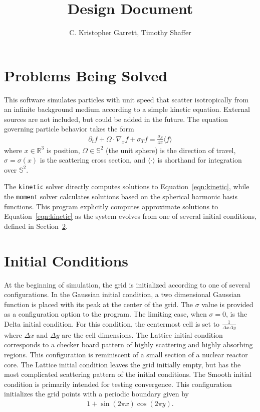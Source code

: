 \documentclass{article}
\title{Design Document}
\author{C. Kristopher Garrett, Timothy Shaffer}
\newcommand{\integral}[1]{\ensuremath{\langle #1 \rangle}}
\newcommand{\twosphere}{\ensuremath{\mathbb{S}^2}\xspace}
\newcommand{\threespace}{\ensuremath{\mathbb{R}^3}\xspace}
\newcommand{\kinetic}{\texttt{kinetic}\xspace}
\newcommand{\moment}{\texttt{moment}\xspace}
\begin{document}
\maketitle

\section{Problems Being Solved}
This software simulates particles with unit speed that scatter isotropically from
an infinite background medium according to a simple kinetic equation. External sources
are not included, but could be added in the future. The equation governing particle
behavior takes the form
\begin{align}
    \label{eqn:kinetic}
    \partial_t f + \Omega \cdot \nabla_x f + \sigma_T f =
    \frac{\sigma_S}{4\pi} \integral{f}
\end{align}
where $x \in \threespace$ is position, $\Omega \in \twosphere$ (the unit sphere)
is the direction of travel, $\sigma = \sigma(x)$ is the scattering cross section, and
\integral{\cdot} is shorthand for integration over \twosphere.

The \kinetic solver directly computes solutions to
Equation~\ref{eqn:kinetic}, while the \moment solver calculates solutions based on
the spherical harmonic basis functions. This program explicitly computes approximate
solutions to Equation~\ref{eqn:kinetic} as
the system evolves from one of several initial conditions, defined in
Section~\ref{sec:initcond}.

\section{Initial Conditions}
\label{sec:initcond}
At the beginning of simulation, the grid is initialized according to one of several
configurations. In the Gaussian initial condition, a two dimensional Gaussian function
is placed with its peak at the center of the grid. The $\sigma$ value is provided as
a configuration option to the program. The limiting case, when $\sigma=0$, is the
Delta initial condition. For this condition, the centermost cell is set to
$\frac{1}{\Delta x \Delta y}$ where $\Delta x$ and $\Delta y$ are the cell
dimensions. The Lattice initial condition corresponds to a checker board pattern of highly scattering and highly absorbing regions. This configuration is reminiscent of a
small section of a nuclear reactor core. The Lattice initial condition leaves the
grid initially empty, but has the most complicated scattering pattern of the initial
conditions. The Smooth initial condition is primarily intended for testing convergence.
This configuration initializes the grid points with a periodic boundary given by
\begin{align}
1 + \sin(2\pi x)\cos(2\pi y).
\end{align}
\end{document}
